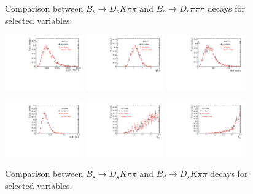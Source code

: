 \begin{figure}[h]

\caption{Comparison between $B_s \to D_s K \pi \pi$ and $B_s \to D_s \pi \pi \pi$ decays for selected variables.}
\label{fig:}

\includegraphics[height=!,width=0.3\textwidth]{figs/dataVsMC/B0vsBs_signal/Ds2all_Bs_PT.pdf}
\includegraphics[height=!,width=0.3\textwidth]{figs/dataVsMC/B0vsBs_signal/Ds2all_Bs_ETA.pdf}
\includegraphics[height=!,width=0.3\textwidth]{figs/dataVsMC/B0vsBs_signal/Ds2all_NTracks.pdf}

\includegraphics[height=!,width=0.3\textwidth]{figs/dataVsMC/B0vsBs_signal/Ds2all_Bs_DTF_TAUERR.pdf}
\includegraphics[height=!,width=0.3\textwidth]{figs/dataVsMC/B0vsBs_signal/Ds2all_Bs_TAGOMEGA_OS.pdf}
\includegraphics[height=!,width=0.3\textwidth]{figs/dataVsMC/B0vsBs_signal/Ds2all_Bs_SS_nnetKaon_PROB.pdf}

\caption{Comparison between $B_s \to D_s K \pi \pi$ and $B_d \to D_s K \pi \pi$ decays for selected variables.}

\end{figure}

